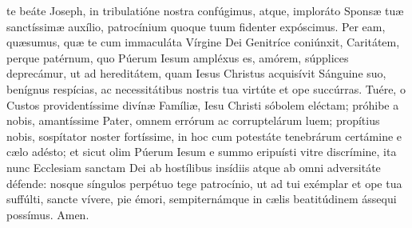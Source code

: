 te beáte Joseph, in tribulatióne nostra confúgimus, atque, imploráto Spons{\ae} tu{\ae} sanctíssim{\ae} auxílio, patrocínium 
quoque tuum fidenter expóscimus. Per eam, qu{\ae}sumus, qu{\ae} te cum immaculáta Vírgine Dei Genitríce coniúnxit, Caritátem, perque patérnum, 
quo Púerum Iesum ampléxus es, amórem, súpplices deprecámur, ut ad hereditátem, quam Iesus Christus acquisívit Sánguine suo, benígnus respícias, 
ac necessitátibus nostris tua virtúte et ope succúrras. Tuére, o Custos providentíssime divín{\ae} Famíli{\ae}, Iesu Christi sóbolem eléctam; próhibe a nobis, 
amantíssime Pater, omnem errórum ac corruptelárum luem; propítius nobis, sospítator noster fortíssime, in hoc cum potestáte tenebrárum certámine e 
c{\ae}lo adésto; et sicut olim Púerum Iesum e summo eripuísti vitre discrímine, ita nunc Ecclesiam sanctam Dei ab hostílibus insídiis atque ab omni 
adversitáte défende: nosque síngulos perpétuo tege patrocínio, ut ad tui exémplar et ope tua suffúlti, sancte vívere, pie émori, sempiternámque in 
c{\ae}lis beatitúdinem ássequi possímus. Amen.